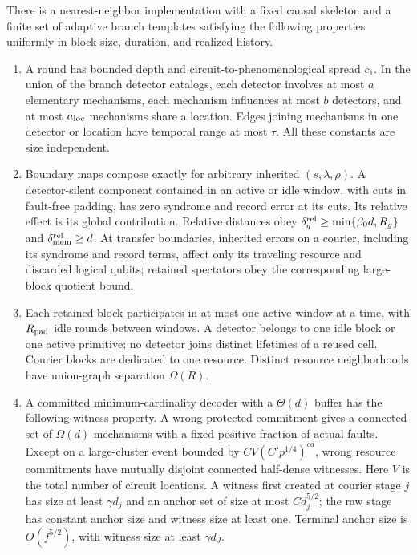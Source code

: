 \begin{assumption}
\label{ass:uniform}
There is a nearest-neighbor implementation with a fixed causal skeleton
and a finite set of adaptive branch templates satisfying the following
properties uniformly in block size, duration, and realized history.
\begin{enumerate}
\item A round has bounded depth and circuit-to-phenomenological spread
$c_1$. In the union of the branch detector catalogs, each detector involves
at most $a$ elementary mechanisms, each mechanism influences at most $b$
detectors, and at most $a_{\rm loc}$ mechanisms share a location. Edges
joining mechanisms in one detector or location have temporal range at
most $\tau$. All these constants are size independent.
\item Boundary maps compose exactly for arbitrary inherited
$(s,\lambda,\rho)$. A detector-silent component contained in an active or
idle window, with cuts in fault-free padding, has zero syndrome and
record error at its cuts. Its relative effect is its global contribution.
Relative distances obey $\delta_g^{\rm rel}\ge
\min\{\beta_0d,R_g\}$ and $\delta_{\rm mem}^{\rm rel}\ge d$.
At transfer boundaries, inherited errors on a courier, including its
syndrome and record terms, affect only its traveling resource and
discarded logical qubits; retained spectators obey the corresponding
large-block quotient bound.
\item Each retained block participates in at most one active window at a
time, with $R_{\rm pad}$ idle rounds between windows. A detector belongs
to one idle block or one active primitive; no detector joins distinct
lifetimes of a reused cell. Courier blocks are dedicated to one resource.
Distinct resource neighborhoods have union-graph separation $\Omega(R)$.
\item A committed minimum-cardinality decoder with a $\Theta(d)$ buffer
has the following witness property. A wrong protected commitment gives a
connected set of $\Omega(d)$ mechanisms with a fixed positive fraction of
actual faults. Except on a large-cluster event bounded by
$C V(C'p^{1/4})^{c d}$, wrong resource commitments have mutually disjoint
connected half-dense witnesses. Here $V$ is the total number of circuit
locations. A witness first created at courier stage $j$ has size at least
$\gamma d_j$ and an anchor set of size at most $C d_j^{5/2}$; the raw stage
has constant anchor size and witness size at least one. Terminal anchor
size is $O(f^{5/2})$, with witness size at least $\gamma d_J$.
\end{enumerate}
\end{assumption}

